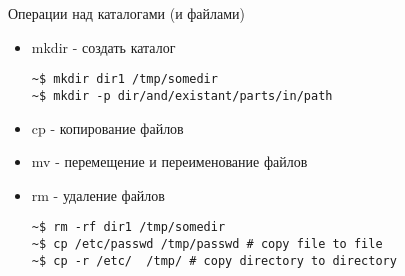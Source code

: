 \begin{frame}[fragile]{Операции над каталогами (и файлами)}
  \begin{itemize}
    \item \alert{mkdir} - создать каталог
\begin{lstlisting}
~$ mkdir dir1 /tmp/somedir
~$ mkdir -p dir/and/existant/parts/in/path
\end{lstlisting} \pause
    \item \alert{cp} - копирование файлов\footnotemark[8]
    \item \alert{mv} - перемещение и переименование файлов
    \item \alert{rm} - удаление файлов\footnotemark[17]
\begin{lstlisting}
~$ rm -rf dir1 /tmp/somedir
~$ cp /etc/passwd /tmp/passwd # copy file to file 
~$ cp -r /etc/  /tmp/ # copy directory to directory
\end{lstlisting}
  \end{itemize}
\end{frame}
